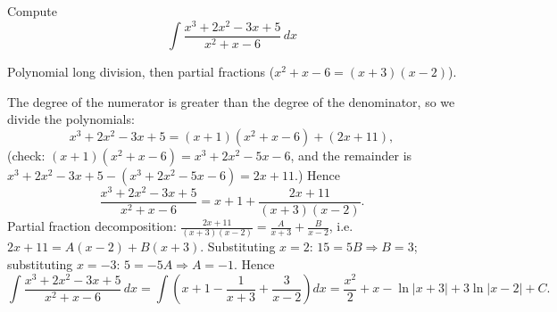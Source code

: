 
\begin{question}
Compute
\[ \int\frac{x^3+2x^2-3x+5}{x^2+x-6}\,dx \]
\end{question}

\begin{hint}
Polynomial long division, then partial fractions ($x^2+x-6=(x+3)(x-2)$).
\end{hint}

\begin{solution}
The degree of the numerator is greater than the degree of the denominator, so we divide the polynomials:
\[ x^3+2x^2-3x+5=(x+1)(x^2+x-6)+(2x+11), \]
(check: $(x+1)(x^2+x-6)=x^3+2x^2-5x-6$, and the remainder is $x^3+2x^2-3x+5-(x^3+2x^2-5x-6)=2x+11$.) Hence
\[ \frac{x^3+2x^2-3x+5}{x^2+x-6}=x+1+\frac{2x+11}{(x+3)(x-2)}. \]
Partial fraction decomposition: $\frac{2x+11}{(x+3)(x-2)}=\frac{A}{x+3}+\frac{B}{x-2}$, i.e. $2x+11=A(x-2)+B(x+3)$. Substituting $x=2$: $15=5B\Rightarrow B=3$; substituting $x=-3$: $5=-5A\Rightarrow A=-1$. Hence
\[ \int\frac{x^3+2x^2-3x+5}{x^2+x-6}\,dx=\int\left(x+1-\frac1{x+3}+\frac3{x-2}\right)dx=\boxed{\frac{x^2}{2}+x-\ln|x+3|+3\ln|x-2|+C}. \]
\end{solution}
